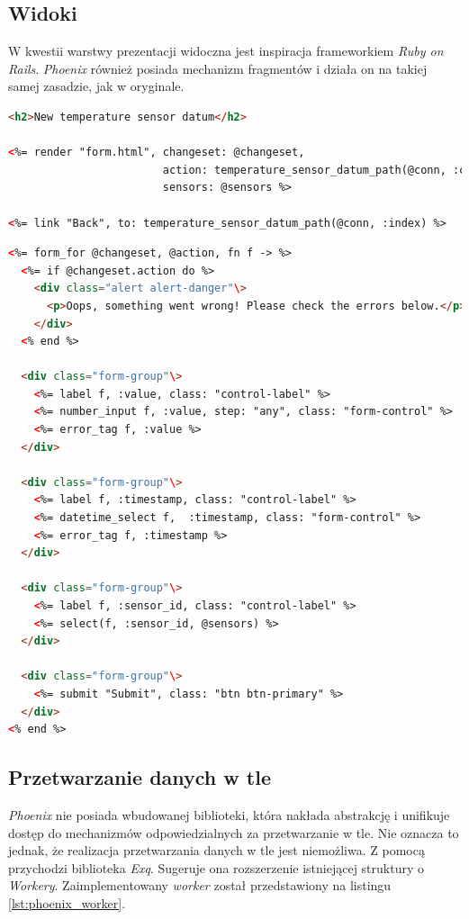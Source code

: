 \subsection{Widoki}
W kwestii warstwy prezentacji widoczna jest inspiracja frameworkiem \emph{Ruby on Rails}. \emph{Phoenix} również posiada mechanizm fragmentów i działa on na takiej samej zasadzie, jak w oryginale.
\newpage

\begin{lstlisting}[caption={Widok, na którym można dodać dane dla sensora w  Phoenix'ie.},label={lst:phoenix_new_data_view},language=HTML]
<h2>New temperature sensor datum</h2>

<%= render "form.html", changeset: @changeset,
                        action: temperature_sensor_datum_path(@conn, :create),
                        sensors: @sensors %>

<%= link "Back", to: temperature_sensor_datum_path(@conn, :index) %>
\end{lstlisting}

\begin{lstlisting}[caption={Fragment, na którym jest formularz we frameworku Phoenix.},label={lst:phoenix_sensor_form_partial},language=HTML]
<%= form_for @changeset, @action, fn f -> %>
  <%= if @changeset.action do %>
    <div class="alert alert-danger"\>
      <p>Oops, something went wrong! Please check the errors below.</p>
    </div>
  <% end %>

  <div class="form-group"\>
    <%= label f, :value, class: "control-label" %>
    <%= number_input f, :value, step: "any", class: "form-control" %>
    <%= error_tag f, :value %>
  </div>

  <div class="form-group"\>
    <%= label f, :timestamp, class: "control-label" %>
    <%= datetime_select f,  :timestamp, class: "form-control" %>
    <%= error_tag f, :timestamp %>
  </div>

  <div class="form-group"\>
    <%= label f, :sensor_id, class: "control-label" %>
    <%= select(f, :sensor_id, @sensors) %>
  </div>

  <div class="form-group"\>
    <%= submit "Submit", class: "btn btn-primary" %>
  </div>
<% end %>
\end{lstlisting}

\subsection{Przetwarzanie danych w tle}
\emph{Phoenix} nie posiada wbudowanej biblioteki, która nakłada abstrakcję i unifikuje dostęp do mechanizmów odpowiedzialnych za przetwarzanie w tle. Nie oznacza to jednak, że realizacja przetwarzania danych w tle jest niemożliwa. Z pomocą przychodzi biblioteka \emph{Exq}. Sugeruje ona rozszerzenie istniejącej struktury o \emph{Workery}. Zaimplementowany \emph{worker} został przedstawiony na listingu \ref{lst:phoenix_worker}.

